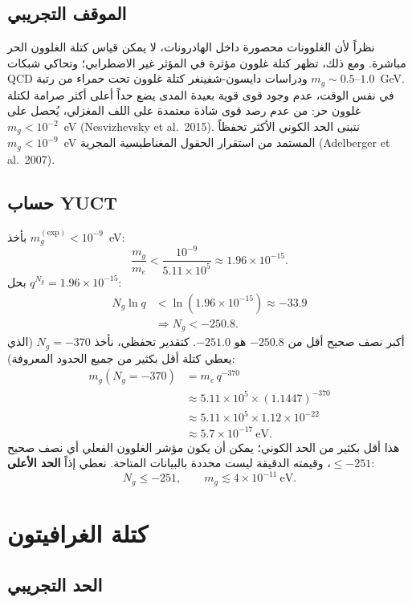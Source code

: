 \documentclass[12pt,a4paper]{article}
\begin{document}
	\subsection{الموقف التجريبي}
	
	نظراً لأن الغلوونات محصورة داخل الهادرونات، لا يمكن قياس كتلة الغلوون الحر مباشرة. ومع ذلك، تظهر كتلة غلوون مؤثرة في المؤثر غير الاضطرابي؛ وتحاكي شبكات QCD ودراسات دايسون-شفينغر كتلة غلوون تحت حمراء من رتبة $m_g \sim 0.5$–$1.0$~GeV. في نفس الوقت، عدم وجود قوى قوية بعيدة المدى يضع حداً أعلى أكثر صرامة لكتلة غلوون حر: من عدم رصد قوى شاذة معتمدة على اللف المغزلي، يُحصل على $m_g < 10^{-2}$~eV (Nesvizhevsky et al.\ 2015). نتبنى الحد الكوني الأكثر تحفظاً $m_g < 10^{-9}$~eV المستمد من استقرار الحقول المغناطيسية المجرية (Adelberger et al.\ 2007).
	
	\subsection{حساب YUCT}
	
	بأخذ $m_g^{\mathrm{(exp)}} < 10^{-9}$~eV:
	\[
	\frac{m_g}{m_e} < \frac{10^{-9}}{5.11\times10^5} \approx 1.96\times 10^{-15}.
	\]
	بحل $q^{N_g} = 1.96\times10^{-15}$:
	\[
	\begin{aligned}
		N_g \ln q &< \ln(1.96\times10^{-15}) \approx -33.9 \\
		&\Longrightarrow N_g < -250.8 .
	\end{aligned}
	\]
	أكبر نصف صحيح أقل من $-250.8$ هو $-251.0$. كتقدير تحفظي، نأخذ $N_g = -370$ (الذي يعطي كتلة أقل بكثير من جميع الحدود المعروفة):
	\[
	\begin{aligned}
		m_g(N_g = -370) &= m_e \, q^{-370} \\
		&\approx 5.11\times10^5 \times (1.1447)^{-370} \\
		&\approx 5.11\times10^5 \times 1.12\times10^{-22} \\
		&\approx 5.7 \times 10^{-17}~\mathrm{eV}.
	\end{aligned}
	\]
	هذا أقل بكثير من الحد الكوني؛ يمكن أن يكون مؤشر الغلوون الفعلي أي نصف صحيح $\le -251$، وقيمته الدقيقة ليست محددة بالبيانات المتاحة. نعطي إذاً \textbf{الحد الأعلى}:
	\[
	\boxed{N_g \le -251}, \qquad
	\boxed{m_g \lesssim 4 \times 10^{-11}~\mathrm{eV}} .
	\]
	
	\section{كتلة الغرافيتون}
	
	\subsection{الحد التجريبي}
	
\end{document}
